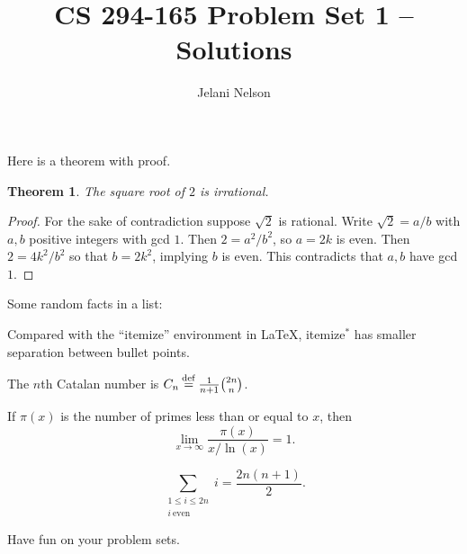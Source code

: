 \documentclass[10pt]{article}
\author{Jelani Nelson}
\title{CS 294-165 Problem Set 1 -- Solutions}
\newenvironment{itemize*}%
  {\vspace{-2ex} \begin{itemize} %
     \setlength{\itemsep}{-1ex} \setlength{\parsep}{0pt}}%
  {\end{itemize}}
\newcommand{\eqdef}{\mathbin{\stackrel{\rm def}{=}}}
\newtheorem{theorem}{Theorem}
\begin{document}
\maketitle

Here is a theorem with proof.

\begin{theorem}
The square root of $2$ is irrational.
\end{theorem}
\begin{proof}
For the sake of contradiction suppose $\sqrt{2}$ is rational. Write $\sqrt{2} = a/b$ with $a,b$ positive integers with gcd $1$. Then $2 = a^2/b^2$, so $a = 2k$ is even. Then $2 = 4k^2/b^2$ so that $b = 2k^2$, implying $b$ is even. This contradicts that $a,b$ have gcd $1$.
\end{proof}

Some random facts in a list:

\begin{itemize*}
\item Compared with the ``itemize'' environment in \LaTeX, itemize$^*$ has smaller separation between bullet points.
\item The $n$th Catalan number is $C_n \eqdef \frac{1}{n+1} \binom{2n}{n}$.
\item If $\pi(x)$ is the number of primes less than or equal to $x$, then
$$\lim_{x\rightarrow\infty} \frac{\pi(x)}{x/\ln(x)} = 1 . $$
\item $$ \sum_{\substack{1\le i\le 2n\\i\ \mathrm{even}}} i = \frac{2n(n+1)}2 .$$
\end{itemize*}

Have fun on your problem sets.
\end{document}
